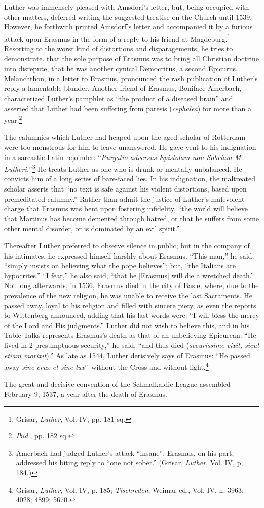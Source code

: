 Luther was immensely pleased with Amsdorf’s letter, but, being
occupied with other matters, deferred writing the suggested treatise
on the Church until 1539. However, he forthwith printed Amsdorf’s
letter and accompanied it by a furious attack upon Erasmus in the
form of a reply to his friend at Magdeburg.\footnote{Grisar, \textit{Luther}, Vol. IV, pp. 181 sq.}
 Resorting to the worst
kind of distortions and disparagements, he tries to demonstrate. that
the sole purpose of Erasmus was to bring all Christian doctrine into
disrepute, that he was another cynical Democritus, a second Epicurus.
Melanchthon, in a letter to Erasmus, pronounced the rash publication
of Luther’s reply a lamentable blunder. Another friend of Erasmus,
Boniface Amerbach, characterized Luther’s pamphlet as “the product
of a diseased brain” and asserted that Luther had been suffering
from paresis (\textit{cephalea}) for more than a year.\footnote{\textit{Ibid.}, pp. 182 sq.}


The calumnies which Luther had heaped upon the aged scholar of
Rotterdam were too monstrous for him to leave unanswered. He gave
vent to his indignation in a sarcastic Latin rejoinder: “\textit{Purgatio adversus
Epistolam non Sobriam M. Lutheri.}”\footnote
{Amerbach had judged Luther’s attack “insane”; Erasmus, on his part, addressed his
biting reply to “one not sober.” (Grisar, \textit{Luther}, Vol. IV, p, 184.)}
He treats Luther as one
who is drunk or mentally unbalanced. He convicts him of a long
series of bare-faced lies. In his indignation, the maltreated scholar
asserts that “no text is safe against his violent distortions, based upon
premeditated calumny.” Rather than admit the justice of Luther’s
malevolent charge that Erasmus was bent upon fostering infidelity,
“the world will believe that Martinus has become demented through
hatred, or that he suffers from some other mental disorder, or is dominated
by an evil spirit.”

Thereafter Luther preferred to observe silence in public; but in the company
of his intimates, he expressed himself harshly about Erasmus. “This
man,” he said, “simply insists on believing what the pope believes”; but,
“the Italians are hypocrites.” “I fear,” he also said, “that he [Erasmus] will
die a wretched death.” Not long afterwards, in 1536, Erasmus died in the
city of Basle, where, due to the prevalence of the new religion, he was unable
to receive the last Sacraments. He passed away, loyal to his religion and
filled with sincere piety, as even the reports to Wittenberg announced, adding
that his last words were: “I will bless the mercy of the Lord and His
judgments.” Luther did not wish to believe this, and in his Table Talks
represents Erasmus’s death as that of an unbelieving Epicurean. “He lived
in 2 presumptuous security,” he said, “and thus died (\textit{securissime vixit,
sicut etiam morixit}).” As late as 1544, Luther derisively says of Erasmus:
“He passed away \textit{sine crux et sine lux}”--without the Cross and without
light.\footnote
{Grisar, \textit{Luther}, Vol. IV, p. 185; \textit{Tischreden}, Weimar ed., Vol. IV, n. 3963; 4028; 4899;
5670.}

The great and decisive convention of the Schmalkaldic League assembled
February 9, 1537, a year after the death of Erasmus.
